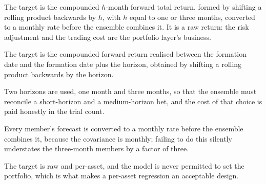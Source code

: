 \begin{takeaway}
The target is the compounded \(h\)-month forward total return, formed by
shifting a rolling product backwards by \(h\), with \(h\) equal to one or
three months, converted to a monthly rate before the ensemble combines it.
It is a raw return: the risk adjustment and the trading cost are the
portfolio layer's business.
\end{takeaway}

\begin{keytakeaways}
\item The target is the compounded forward return realised between the
formation date and the formation date plus the horizon, obtained by
shifting a rolling product backwards by the horizon.
\item Two horizons are used, one month and three months, so that the
ensemble must reconcile a short-horizon and a medium-horizon bet, and the
cost of that choice is paid honestly in the trial count.
\item Every member's forecast is converted to a monthly rate before the
ensemble combines it, because the covariance is monthly; failing to do
this silently understates the three-month members by a factor of three.
\item The target is raw and per-asset, and the model is never permitted to
set the portfolio, which is what makes a per-asset regression an
acceptable design.
\end{keytakeaways}
